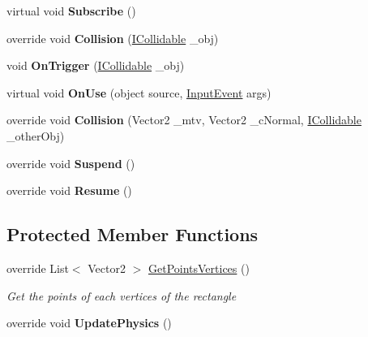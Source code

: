 \begin{DoxyCompactItemize}
virtual void {\bfseries Subscribe} ()
\item 
\mbox{\label{class_g_m_t_b_1_1_collision_system_1_1_door_a117232e0a453e19ad97eb2d7de3dc9e1}} 
override void {\bfseries Collision} (\mbox{\hyperlink{interface_g_m_t_b_1_1_collision_system_1_1_i_collidable}{I\+Collidable}} \+\_\+obj)
\item 
\mbox{\label{class_g_m_t_b_1_1_collision_system_1_1_door_a6c56d930bca27fedb564280fac33c7ee}} 
void {\bfseries On\+Trigger} (\mbox{\hyperlink{interface_g_m_t_b_1_1_collision_system_1_1_i_collidable}{I\+Collidable}} \+\_\+obj)
\item 
\mbox{\label{class_g_m_t_b_1_1_collision_system_1_1_door_ac148386f2e9b3044e62668a396b63a98}} 
virtual void {\bfseries On\+Use} (object source, \mbox{\hyperlink{class_g_m_t_b_1_1_input_system_1_1_input_event}{Input\+Event}} args)
\item 
\mbox{\label{class_g_m_t_b_1_1_collision_system_1_1_door_a67decb656afa8c441b11997924804792}} 
override void {\bfseries Collision} (Vector2 \+\_\+mtv, Vector2 \+\_\+c\+Normal, \mbox{\hyperlink{interface_g_m_t_b_1_1_collision_system_1_1_i_collidable}{I\+Collidable}} \+\_\+other\+Obj)
\item 
\mbox{\label{class_g_m_t_b_1_1_collision_system_1_1_door_aaee59b309d63e9fcd18115d28d1bf9c8}} 
override void {\bfseries Suspend} ()
\item 
\mbox{\label{class_g_m_t_b_1_1_collision_system_1_1_door_ab176fffe1ec86b35ba373f0ee35057b0}} 
override void {\bfseries Resume} ()
\end{DoxyCompactItemize}
\subsection*{Protected Member Functions}
\begin{DoxyCompactItemize}
\item 
override List$<$ Vector2 $>$ \mbox{\hyperlink{class_g_m_t_b_1_1_collision_system_1_1_door_ae6c1c2e7efb9fe03a930b0967de1b819}{Get\+Points\+Vertices}} ()
\begin{DoxyCompactList}\small\item\em Get the points of each vertices of the rectangle \end{DoxyCompactList}\item 
\mbox{\label{class_g_m_t_b_1_1_collision_system_1_1_door_a1091de9fe31a61125e0686dcf27c925a}} 
override void {\bfseries Update\+Physics} ()
\end{DoxyCompactItemize}

